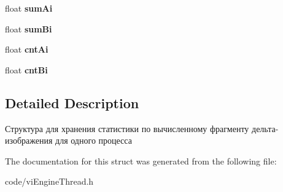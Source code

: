 \begin{DoxyCompactItemize}
\item 
\hypertarget{struct_c_v_i_engine_thread_1_1tag_t_m_p___s_t_a_t_a81b73bf1a21f7b5ca9235ec5e2cd1f90}{float {\bfseries sum\+Ai}}\label{struct_c_v_i_engine_thread_1_1tag_t_m_p___s_t_a_t_a81b73bf1a21f7b5ca9235ec5e2cd1f90}

\item 
\hypertarget{struct_c_v_i_engine_thread_1_1tag_t_m_p___s_t_a_t_a24a306060f8d7911ee7192cac265523f}{float {\bfseries sum\+Bi}}\label{struct_c_v_i_engine_thread_1_1tag_t_m_p___s_t_a_t_a24a306060f8d7911ee7192cac265523f}

\item 
\hypertarget{struct_c_v_i_engine_thread_1_1tag_t_m_p___s_t_a_t_ad5c691a4f5a4dca0c461909bd5dd27a7}{float {\bfseries cnt\+Ai}}\label{struct_c_v_i_engine_thread_1_1tag_t_m_p___s_t_a_t_ad5c691a4f5a4dca0c461909bd5dd27a7}

\item 
\hypertarget{struct_c_v_i_engine_thread_1_1tag_t_m_p___s_t_a_t_a4e1fc8a04fbf22508774ecdf52ff8d28}{float {\bfseries cnt\+Bi}}\label{struct_c_v_i_engine_thread_1_1tag_t_m_p___s_t_a_t_a4e1fc8a04fbf22508774ecdf52ff8d28}

\end{DoxyCompactItemize}


\subsection{Detailed Description}
Структура для хранения статистики по вычисленному фрагменту дельта-\/изображения для одного процесса 



The documentation for this struct was generated from the following file\+:\begin{DoxyCompactItemize}
\item 
code/vi\+Engine\+Thread.\+h\end{DoxyCompactItemize}
